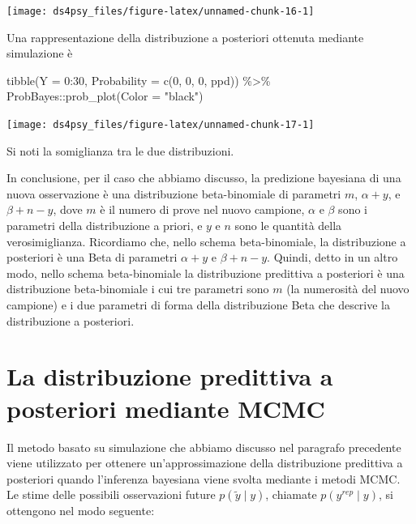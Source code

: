 \documentclass[
  11pt,
]{krantz}
\makeatletter
\newenvironment{Shaded}{\begin{snugshade}}{\end{snugshade}}
\newcommand{\AttributeTok}[1]{\textcolor[rgb]{0.61,0.61,0.61}{#1}}
\newcommand{\DecValTok}[1]{\textcolor[rgb]{0.06,0.06,0.06}{#1}}
\newcommand{\FunctionTok}[1]{\textcolor[rgb]{0,0,0}{#1}}
\newcommand{\NormalTok}[1]{#1}
\newcommand{\SpecialCharTok}[1]{\textcolor[rgb]{0,0,0}{#1}}
\newcommand{\StringTok}[1]{\textcolor[rgb]{0.5,0.5,0.5}{#1}}
\newenvironment{kframe}{%
\medskip{}
\setlength{\fboxsep}{.8em}
 \def\at@end@of@kframe{}%
 \ifinner\ifhmode%
  \def\at@end@of@kframe{\end{minipage}}%
  \begin{minipage}{\columnwidth}%
 \fi\fi%
 \def\FrameCommand##1{\hskip\@totalleftmargin \hskip-\fboxsep
 \colorbox{shadecolor}{##1}\hskip-\fboxsep
     \hskip-\linewidth \hskip-\@totalleftmargin \hskip\columnwidth}%
 \MakeFramed {\advance\hsize-\width
   \@totalleftmargin\z@ \linewidth\hsize
   \@setminipage}}%
 {\par\unskip\endMakeFramed%
 \at@end@of@kframe}
\renewenvironment{Shaded}{\begin{kframe}}{\end{kframe}}
\theoremstyle{definition}
\theoremstyle{definition}
\theoremstyle{definition}
\theoremstyle{definition}
\theoremstyle{remark}
\makeatother
\begin{document}
\begin{center}\texttt{[image: ds4psy\_files/figure-latex/unnamed-chunk-16-1]} \end{center}

Una rappresentazione della distribuzione a posteriori ottenuta mediante simulazione è

\begin{Shaded}
\begin{Highlighting}[]
\FunctionTok{tibble}\NormalTok{(}\AttributeTok{Y =} \DecValTok{0}\SpecialCharTok{:}\DecValTok{30}\NormalTok{, }\AttributeTok{Probability =} \FunctionTok{c}\NormalTok{(}\DecValTok{0}\NormalTok{, }\DecValTok{0}\NormalTok{, }\DecValTok{0}\NormalTok{, ppd)) }\SpecialCharTok{\%\textgreater{}\%}
\NormalTok{  ProbBayes}\SpecialCharTok{::}\FunctionTok{prob\_plot}\NormalTok{(}\AttributeTok{Color =} \StringTok{"black"}\NormalTok{)}
\end{Highlighting}
\end{Shaded}

\begin{center}\texttt{[image: ds4psy\_files/figure-latex/unnamed-chunk-17-1]} \end{center}

Si noti la somiglianza tra le due distribuzioni.

In conclusione, per il caso che abbiamo discusso, la predizione bayesiana di una nuova osservazione è una distribuzione beta-binomiale di parametri \(m\), \(\alpha + y\), e \(\beta + n - y\), dove \(m\) è il numero di prove nel nuovo campione, \(\alpha\) e \(\beta\) sono i parametri della distribuzione a priori, e \(y\) e \(n\) sono le quantità della verosimiglianza. Ricordiamo che, nello schema beta-binomiale, la distribuzione a posteriori è una Beta di parametri \(\alpha + y\) e \(\beta + n - y\). Quindi, detto in un altro modo, nello schema beta-binomiale la distribuzione predittiva a posteriori è una distribuzione beta-binomiale i cui tre parametri sono \(m\) (la numerosità del nuovo campione) e i due parametri di forma della distribuzione Beta che descrive la distribuzione a posteriori.

\hypertarget{la-distribuzione-predittiva-a-posteriori-mediante-mcmc}{%
\section{La distribuzione predittiva a posteriori mediante MCMC}\label{la-distribuzione-predittiva-a-posteriori-mediante-mcmc}}

Il metodo basato su simulazione che abbiamo discusso nel paragrafo precedente viene utilizzato per ottenere un'approssimazione della distribuzione predittiva a posteriori quando l'inferenza bayesiana viene svolta mediante i metodi MCMC. Le stime delle possibili osservazioni future \(p(\tilde{y} \mid y)\), chiamate \(p(y^{rep} \mid y)\), si ottengono nel modo seguente:
\end{document}
